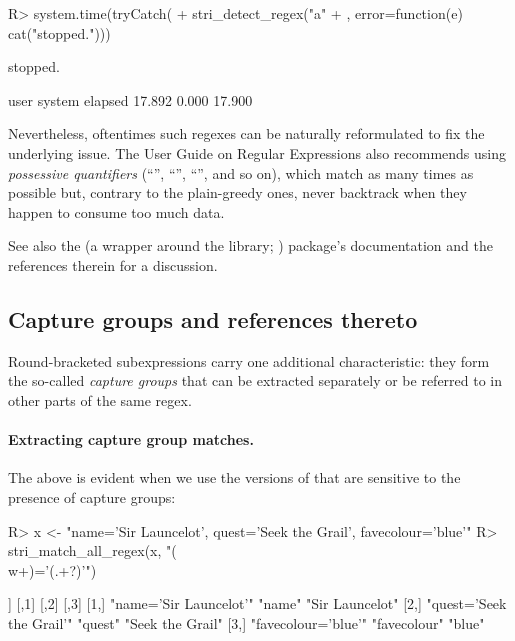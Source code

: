 \documentclass[nojss]{jss}
\begin{document}
\begin{Schunk}
\begin{Sinput}
R> system.time(tryCatch({
+    stri_detect_regex("a" %s*% 1000 %s+% "c", "(a+)+b", time_limit=1e5)
+  }, error=function(e) cat("stopped.")))
\end{Sinput}
\begin{Soutput}
stopped.
\end{Soutput}
\begin{Soutput}
   user  system elapsed
 17.892   0.000  17.900
\end{Soutput}
\end{Schunk}


Nevertheless, oftentimes such regexes can be naturally
reformulated to  fix the underlying issue.
The  User Guide on Regular Expressions also recommends using
\textit{possessive quantifiers} (``'', ``\code{*+}'', ``\code{++}'', and so on),
which match as many times as possible but, contrary to
the plain-greedy ones, never backtrack when they happen to consume too much data.

See also the  (a wrapper around the  library;
\citealp{re2r}) package's
documentation and the references therein for a discussion.




\subsection{Capture groups and references thereto}\label{Sec:Capturing}

Round-bracketed subexpressions carry one additional
characteristic: they form the so-called \textit{capture groups} that can
be extracted separately or be referred to in other parts of the same regex.




\paragraph{Extracting capture group matches.}
The above is evident when we use the
versions of  that are sensitive to the presence
of capture groups:


\begin{Schunk}
\begin{Sinput}
R> x <- "name='Sir Launcelot', quest='Seek the Grail', favecolour='blue'"
R> stri_match_all_regex(x, "(\\w+)='(.+?)'")
\end{Sinput}
\begin{Soutput}
[[1]]
     [,1]                     [,2]         [,3]
[1,] "name='Sir Launcelot'"   "name"       "Sir Launcelot"
[2,] "quest='Seek the Grail'" "quest"      "Seek the Grail"
[3,] "favecolour='blue'"      "favecolour" "blue"
\end{Soutput}
\end{Schunk}
\end{document}

